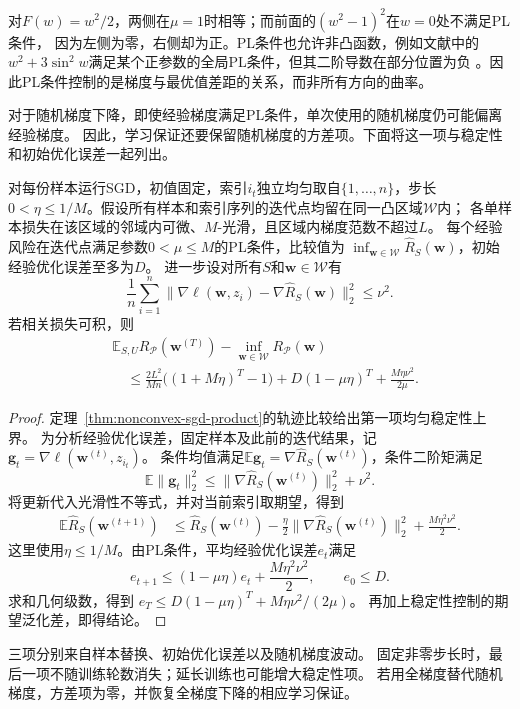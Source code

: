 对$F(w)=w^2/2$，两侧在$\mu=1$时相等；而前面的$(w^2-1)^2$在$w=0$处不满足PL条件，
因为左侧为零，右侧却为正。PL条件也允许非凸函数，例如文献中的
$w^2+3\sin^2w$满足某个正参数的全局PL条件，但其二阶导数在部分位置为负
。因此PL条件控制的是梯度与最优值差距的关系，而非所有方向的曲率。

对于随机梯度下降，即使经验梯度满足PL条件，单次使用的随机梯度仍可能偏离经验梯度。
因此，学习保证还要保留随机梯度的方差项。下面将这一项与稳定性和初始优化误差一起列出。

\begin{theorem}[PL条件下非凸SGD的学习保证]
\label{thm:pl-stability-learning}
对每份样本运行SGD，初值固定，索引$i_t$独立均匀取自$\{1,\ldots,n\}$，步长
$0<\eta\leq1/M$。假设所有样本和索引序列的迭代点均留在同一凸区域$\mathcal W$内；
各单样本损失在该区域的邻域内可微、$M$-光滑，且区域内梯度范数不超过$L$。
每个经验风险在迭代点满足参数$0<\mu\leq M$的PL条件，比较值为
$\inf_{\bm w\in\mathcal W}\hat R_S(\bm w)$，初始经验优化误差至多为$D$。
进一步设对所有$S$和$\bm w\in\mathcal W$有
\[
 \frac1n\sum_{i=1}^n
 \|\nabla\ell(\bm w,z_i)-\nabla\hat R_S(\bm w)\|_2^2\leq\nu^2.
\]
若相关损失可积，则
\begin{align*}
 &\mathbb E_{S,U}R_{\mathcal P}(\bm w^{(T)})-
   \inf_{\bm w\in\mathcal W}R_{\mathcal P}(\bm w)\\
 &\quad\leq\frac{2L^2}{Mn}\bigl((1+M\eta)^T-1\bigr)
                  +D(1-\mu\eta)^T+\frac{M\eta\nu^2}{2\mu}.
\end{align*}
\end{theorem}
\begin{proof}
定理~\ref{thm:nonconvex-sgd-product}的轨迹比较给出第一项均匀稳定性上界。
为分析经验优化误差，固定样本及此前的迭代结果，记
$\bm g_t=\nabla\ell(\bm w^{(t)},z_{i_t})$。
条件均值满足$\mathbb E\bm g_t=\nabla\hat R_S(\bm w^{(t)})$，条件二阶矩满足
\[
 \mathbb E\|\bm g_t\|_2^2
 \leq\|\nabla\hat R_S(\bm w^{(t)})\|_2^2+\nu^2.
\]
将更新代入光滑性不等式，并对当前索引取期望，得到
\begin{align*}
 \mathbb E\hat R_S(\bm w^{(t+1)})
 &\leq\hat R_S(\bm w^{(t)})
 -\frac\eta2\|\nabla\hat R_S(\bm w^{(t)})\|_2^2
 +\frac{M\eta^2\nu^2}{2}.
\end{align*}
这里使用$\eta\leq1/M$。由PL条件，平均经验优化误差$e_t$满足
\[
 e_{t+1}\leq(1-\mu\eta)e_t+\frac{M\eta^2\nu^2}{2},
 \qquad e_0\leq D.
\]
求和几何级数，得到
$e_T\leq D(1-\mu\eta)^T+M\eta\nu^2/(2\mu)$。
再加上稳定性控制的期望泛化差，即得结论。
\end{proof}

三项分别来自样本替换、初始优化误差以及随机梯度波动。
固定非零步长时，最后一项不随训练轮数消失；延长训练也可能增大稳定性项。
若用全梯度替代随机梯度，方差项为零，并恢复全梯度下降的相应学习保证。

